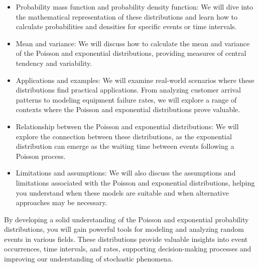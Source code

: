 \begin{itemize}
\item Probability mass function and probability density function: We will dive into the mathematical representation of these distributions and learn how to calculate probabilities and densities for specific events or time intervals.

\item Mean and variance: We will discuss how to calculate the mean and variance of the Poisson and exponential distributions, providing measures of central tendency and variability.

\item Applications and examples: We will examine real-world scenarios where these distributions find practical applications. From analyzing customer arrival patterns to modeling equipment failure rates, we will explore a range of contexts where the Poisson and exponential distributions prove valuable.

\item Relationship between the Poisson and exponential distributions: We will explore the connection between these distributions, as the exponential distribution can emerge as the waiting time between events following a Poisson process.

\item Limitations and assumptions: We will also discuss the assumptions and limitations associated with the Poisson and exponential distributions, helping you understand when these models are suitable and when alternative approaches may be necessary.
\end{itemize}

By developing a solid understanding of the Poisson and exponential probability distributions, you will gain powerful tools for modeling and analyzing random events in various fields. These distributions provide valuable insights into event occurrences, time intervals, and rates, supporting decision-making processes and improving our understanding of stochastic phenomena.